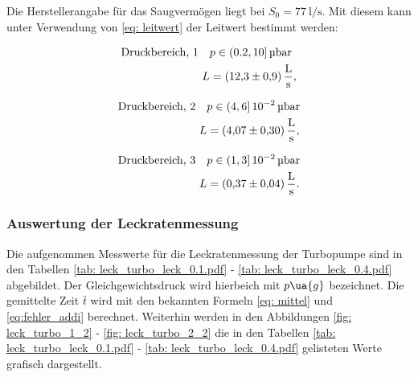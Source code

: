 Die Herstellerangabe für das Saugvermögen liegt bei $S_0=\SI{77}{\litre\per\second}$.
Mit diesem kann unter Verwendung von \eqref{eq: leitwert} der Leitwert bestimmt werden:

\begin{align}
  \label{eq:turbo_leit_1}
  \begin{aligned}
    \text{Druckbereich, 1} \quad  &p\in(0.2,10]\,\si{\micro\bar} \\
   L&=\SI{12.3\pm 0.9}{\litre\per\second},
\end{aligned}
\end{align}

\begin{align}
  \label{eq:turbo_leit_2}
  \begin{aligned}
    \text{Druckbereich, 2} \quad  &p\in(4,6]\,\num{e-2}\,\si{\micro\bar} \\
   L&=\SI{4.07\pm 0.30}{\litre\per\second},
\end{aligned}
\end{align}

\begin{align}
  \label{eq:turbo_leit_3}
  \begin{aligned}
    \text{Druckbereich, 3} \quad  &p\in(1,3]\,\num{e-2}\,\si{\micro\bar} \\
   L&=\SI{0.37\pm 0.04}{\litre\per\second}.
\end{aligned}
\end{align}

\subsubsection{Auswertung der Leckratenmessung}

Die aufgenommen Messwerte für die Leckratenmessung der Turbopumpe sind in den Tabellen \ref{tab: leck_turbo_leck_0.1.pdf} - \ref{tab: leck_turbo_leck_0.4.pdf}
abgebildet. Der Gleichgewichtsdruck wird hierbeich mit $p\ua{g}$ bezeichnet.
Die gemittelte Zeit $\bar{t}$ wird mit den bekannten Formeln \eqref{eq: mittel} und \eqref{eq:fehler_addi} berechnet.
Weiterhin werden in den Abbildungen \ref{fig: leck_turbo_1_2} - \ref{fig: leck_turbo_2_2} die in den Tabellen \ref{tab: leck_turbo_leck_0.1.pdf} - \ref{tab: leck_turbo_leck_0.4.pdf}
gelisteten Werte grafisch dargestellt.






